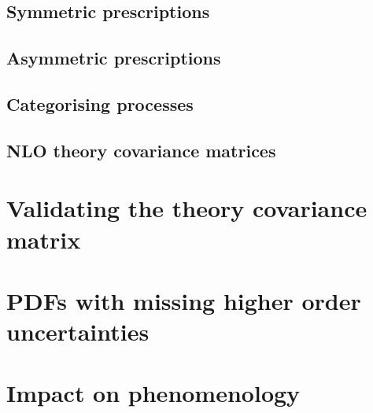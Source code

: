 \subsection{Symmetric prescriptions}
\subsection{Asymmetric prescriptions}
\subsection{Categorising processes}
\subsection{NLO theory covariance matrices}

\section{Validating the theory covariance matrix}
\label{sec:valid}

\section{PDFs with missing higher order uncertainties}
\label{sec:pdfs}

\section{Impact on phenomenology}
\label{sec:mhoupheno}
